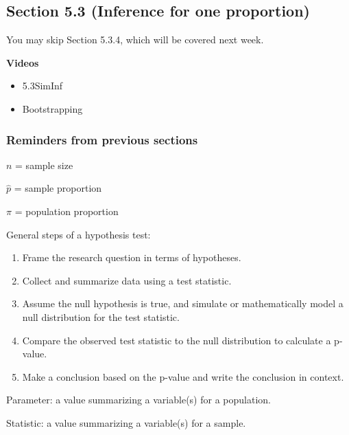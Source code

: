 \documentclass[
]{report}
\providecommand{\tightlist}{%
  \setlength{\itemsep}{0pt}\setlength{\parskip}{0pt}}
\begin{document}
\hypertarget{section-5.3-inference-for-one-proportion}{%
\subsection*{Section 5.3 (Inference for one proportion)}\label{section-5.3-inference-for-one-proportion}}


You may skip Section 5.3.4, which will be covered next week.

\textbf{Videos}

\begin{itemize}
\tightlist
\item
  5.3SimInf
\item
  Bootstrapping
\end{itemize}

\hypertarget{reminders-from-previous-sections}{%
\subsubsection*{Reminders from previous sections}\label{reminders-from-previous-sections}}

\(n\) = sample size

\(\hat{p}\) = sample proportion

\(\pi\) = population proportion

General steps of a hypothesis test:

\begin{enumerate}
\def\labelenumi{\arabic{enumi}.}
\item
  Frame the research question in terms of hypotheses.
\item
  Collect and summarize data using a test statistic.
\item
  Assume the null hypothesis is true, and simulate or mathematically model a null distribution for the test statistic.
\item
  Compare the observed test statistic to the null distribution to calculate a p-value.
\item
  Make a conclusion based on the p-value and write the conclusion in context.
\end{enumerate}

Parameter: a value summarizing a variable(s) for a population.

Statistic: a value summarizing a variable(s) for a sample.
\end{document}
